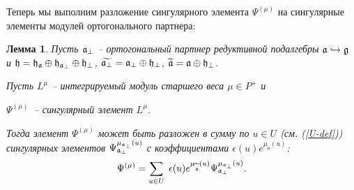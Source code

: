 \documentclass[12pt]{article}
\newtheorem{lemma}{Лемма}
\theoremstyle{definition}
\begin{document}
Теперь мы выполним разложение сингулярного элемента  $\Psi ^{\left(\mu \right) }$ на сингулярные элементы модулей ортогонального партнера:

\begin{lemma}

Пусть  $\frak{a}_{\bot }$ -- ортогональный партнер редуктивной подалгебры  $\frak{a}\hookrightarrow \frak{g}$ и $\frak{h}=\frak{\frak{h}_{\frak{a}}}\oplus \frak{h}_{\frak{a}_{\perp }}\oplus \frak{h}_{\perp }$, $\widetilde{%
\frak{a}_{\perp }}=\frak{a}_{\perp }\oplus \frak{h}_{\perp }$, $%
\widetilde{\frak{a}}=\frak{a}\oplus \frak{h}_{\perp }$.

Пусть $L^{\mu }$ -- интегрируемый модуль старшего веса  $\mu \in P^{+}$ и 

$\Psi ^{\left( \mu \right) }$\ -- сингулярный элемент $L^{\mu }$.

Тогда элемент  $\Psi ^{\left( \mu \right) }$ может быть разложен в сумму по  $u\in U$ (см. (\ref{U-def})) сингулярных элементов $\Psi _{\frak{a}_{\perp }}^{\mu _{\frak{a}_{\perp }}\left( u\right) }$ с коэффициентами
$\epsilon (u)e^{\mu _{\widetilde{\mathfrak{a}}}\left( u\right) }$:
\begin{equation}
\Psi ^{\left( \mu \right) }=\sum_{u\in U}\;\epsilon (u)e^{\mu _{\widetilde{%
\mathfrak{a}}}\left( u\right) }\Psi _{\frak{a}_{\perp }}^{\mu _{\frak{a}%
_{\perp }}\left( u\right) }.  \label{sing decomp main}
\end{equation}
\label{Psi-decomp-lemma}
\end{lemma}
\end{document}
